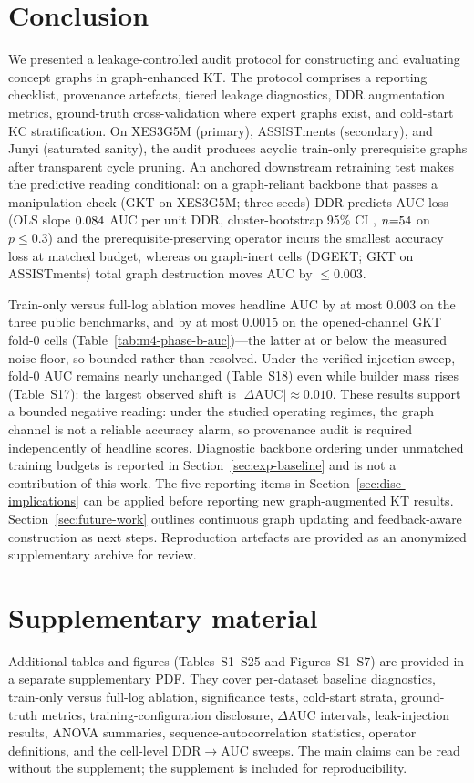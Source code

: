 \documentclass[preprint,10pt,doubleblind]{elsarticle}
\newcommand{\DDR}{\textsc{DDR}}
\begin{document}
\section{Conclusion}
\label{sec:concl}
We presented a leakage-controlled audit protocol for constructing and
evaluating concept graphs in graph-enhanced KT. The protocol comprises a
reporting checklist, provenance artefacts, tiered leakage diagnostics,
\DDR{} augmentation metrics, ground-truth cross-validation where expert graphs
exist, and cold-start KC stratification. On XES3G5M (primary), ASSISTments (secondary), and Junyi (saturated sanity),
the audit produces acyclic train-only prerequisite graphs after transparent
cycle pruning. An anchored downstream retraining test makes the predictive
reading conditional: on a graph-reliant backbone that passes a manipulation
check (GKT on XES3G5M; three seeds) \DDR{} predicts AUC loss (OLS slope
$0.084$ AUC per unit \DDR{}, cluster-bootstrap 95\% CI
\DDRslopeXEScoreci, $n{=}54$ on $p{\le}0.3$) and the
prerequisite-preserving operator incurs the smallest accuracy loss at matched
budget, whereas on graph-inert cells (DGEKT; GKT on ASSISTments) total
graph destruction moves AUC by ${\le}0.003$.

Train-only versus full-log ablation moves headline AUC by at most $0.003$
on the three public benchmarks, and by at most $0.0015$ on the opened-channel
GKT fold-0 cells (Table~\ref{tab:m4-phase-b-auc})---the latter at or below the
measured noise floor, so bounded rather than resolved.
Under the verified injection sweep, fold-0
AUC remains nearly unchanged (Table~S18) even while builder mass rises
(Table~S17): the largest observed shift is $|\Delta\text{AUC}|{\approx}0.010$.
These results support a bounded negative reading: under the studied
operating regimes, the graph channel is not a reliable accuracy alarm, so
provenance audit is required independently of headline scores. Diagnostic
backbone ordering under unmatched training budgets is reported in
Section~\ref{sec:exp-baseline} and is not a contribution of this work. The
five reporting items in Section~\ref{sec:disc-implications} can be applied
before reporting new graph-augmented KT results. Section~\ref{sec:future-work}
outlines continuous graph updating and feedback-aware construction as next
steps.
Reproduction artefacts are provided as an anonymized supplementary
archive for review.

\section*{Supplementary material}
\label{sec:appendix-index}
Additional tables and figures (Tables~S1--S25 and Figures~S1--S7) are
provided in a separate supplementary PDF. They cover per-dataset
baseline diagnostics, train-only versus full-log ablation, significance
tests, cold-start strata, ground-truth metrics, training-configuration
disclosure, $\Delta$AUC intervals, leak-injection results, ANOVA
summaries, sequence-autocorrelation statistics, operator definitions,
and the cell-level \DDR{}$\to$AUC sweeps. The main claims can be read without the supplement;
the supplement is included for reproducibility.
\end{document}
